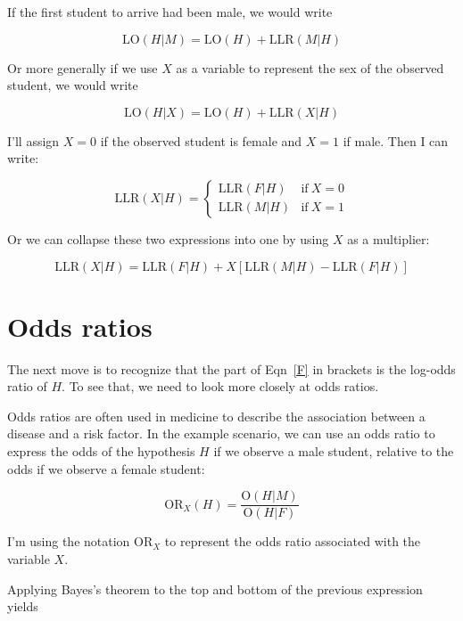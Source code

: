 \documentclass[12pt]{article}
\renewcommand{\O}{\mathrm{O}}
\newcommand{\LO}{\mathrm{LO}}
\newcommand{\LLR}{\mathrm{LLR}}
\newcommand{\OR}{\mathrm{OR}}
\newcommand{\IF}{\mathrm{if}}
\begin{document}
If the first student to arrive had been male, we would write

\begin{equation} \label{C} \nonumber
\LO(H|M) = \LO(H) + \LLR(M|H)
\end{equation}

Or more generally if we use $X$ as a variable to represent
the sex of the observed student, we would write

\begin{equation} \label{D}
\LO(H|X) = \LO(H) + \LLR(X|H)
\end{equation}

I'll assign $X=0$ if the observed student is female and
$X=1$ if male.  Then I can write:

\begin{equation} \label{E} \nonumber
\LLR(X|H) = \left\{
  \begin{array}{lr}
    \LLR(F|H) & \IF ~X = 0\\
    \LLR(M|H) & \IF ~X = 1
  \end{array}
\right.
\end{equation}

Or we can collapse these two expressions into one by using
$X$ as a multiplier:

\begin{equation} \label{F}
\LLR(X|H) = \LLR(F|H) + X [\LLR(M|H) - \LLR(F|H)]
\end{equation}


\section{Odds ratios}

The next move is to recognize that 
the part of Eqn~\ref{F} in brackets is the log-odds ratio
of $H$.  To see that, we need to look more closely at odds ratios.

Odds ratios are often used in medicine to describe the association
between a disease and a risk factor.  In the example scenario, we
can use an odds ratio to express the odds of the hypothesis
$H$ if we observe a male student, relative to the odds if we
observe a female student:

\[ \OR_X(H) = \frac{\O(H|M)}{\O(H|F)} \]

I'm using the notation $\OR_X$ to represent the odds ratio
associated with the variable $X$.

Applying Bayes's theorem to
the top and bottom of the previous expression yields
\end{document}
